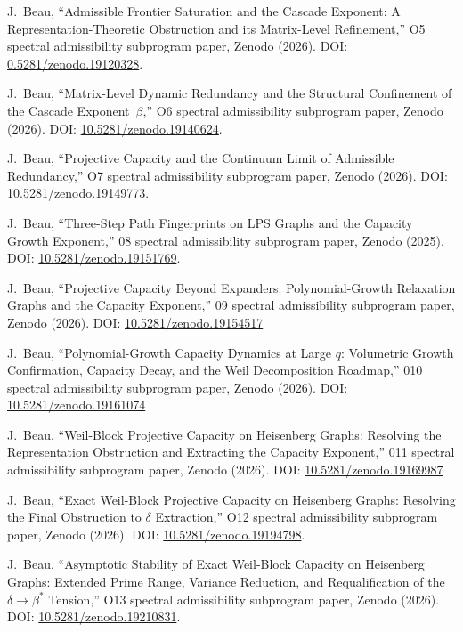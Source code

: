 J.~Beau,
``Admissible Frontier Saturation and the Cascade Exponent: A Representation-Theoretic Obstruction and its Matrix-Level
Refinement,''
O5 spectral admissibility subprogram paper, Zenodo (2026).
DOI: \href{https://doi.org/10.5281/zenodo.19120328}{0.5281/zenodo.19120328}.

J.~Beau,
``Matrix-Level Dynamic Redundancy and the Structural Confinement of the Cascade Exponent~$\beta$,''
O6 spectral admissibility subprogram paper, Zenodo (2026).
DOI: \href{https://doi.org/10.5281/zenodo.19140624}{10.5281/zenodo.19140624}.

J.~Beau,
``Projective Capacity and the Continuum Limit of Admissible Redundancy,''
O7 spectral admissibility subprogram paper, Zenodo (2026).
DOI: \href{https://doi.org/10.5281/zenodo.19149773}{10.5281/zenodo.19149773}.

J.~Beau,
``Three-Step Path Fingerprints on LPS Graphs and the Capacity Growth Exponent,''
08 spectral admissibility subprogram paper, Zenodo (2025).
DOI: \href{https://doi.org/10.5281/zenodo.19151769}{10.5281/zenodo.19151769}.

J.~Beau,
``Projective Capacity Beyond Expanders: Polynomial-Growth Relaxation Graphs and the Capacity Exponent,''
09 spectral admissibility subprogram paper, Zenodo (2026).
DOI: \href{https://doi.org/10.5281/zenodo.19154517}{10.5281/zenodo.19154517}

J.~Beau,
``Polynomial-Growth Capacity Dynamics at Large $q$: Volumetric Growth Confirmation, Capacity Decay, and the Weil
Decomposition Roadmap,''
010 spectral admissibility subprogram paper, Zenodo (2026).
DOI: \href{https://doi.org/10.5281/zenodo.19161074}{10.5281/zenodo.19161074}

J.~Beau,
``Weil-Block Projective Capacity on Heisenberg Graphs: Resolving the Representation Obstruction and Extracting the
Capacity Exponent,''
011 spectral admissibility subprogram paper, Zenodo (2026).
DOI: \href{https://doi.org/10.5281/zenodo.19169987}{10.5281/zenodo.19169987}

J.~Beau,
``Exact Weil-Block Projective Capacity on Heisenberg Graphs: Resolving the Final Obstruction to $\delta$ Extraction,''
O12 spectral admissibility subprogram paper, Zenodo (2026).
DOI: \href{https://doi.org/10.5281/zenodo.19194798}{10.5281/zenodo.19194798}.

J.~Beau,
``Asymptotic Stability of Exact Weil-Block Capacity on Heisenberg Graphs: Extended Prime Range, Variance Reduction,
and Requalification of the \(\delta \to \beta^*\) Tension,''
O13 spectral admissibility subprogram paper, Zenodo (2026).
DOI: \href{https://doi.org/10.5281/zenodo.19210831}{10.5281/zenodo.19210831}.

